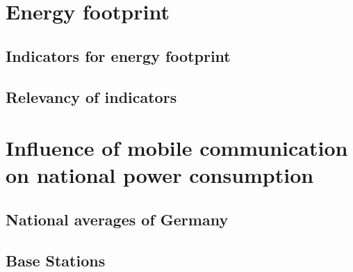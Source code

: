 \documentclass[11pt,a4paper]{article}
\begin{document}




\section{Energy footprint}\label{sec:energyfootprint}
\subsection{Indicators for energy footprint}\label{subsec:indicators}
\subsection{Relevancy of indicators}\label{subsec:relevancy}

\section{Influence of mobile communication on national power consumption}\label{sec:influence}
\subsection{National averages of Germany}\label{subsec:nationalaverage}
\subsection{Base Stations}\label{subsec:BSInfluence}
\end{document}
